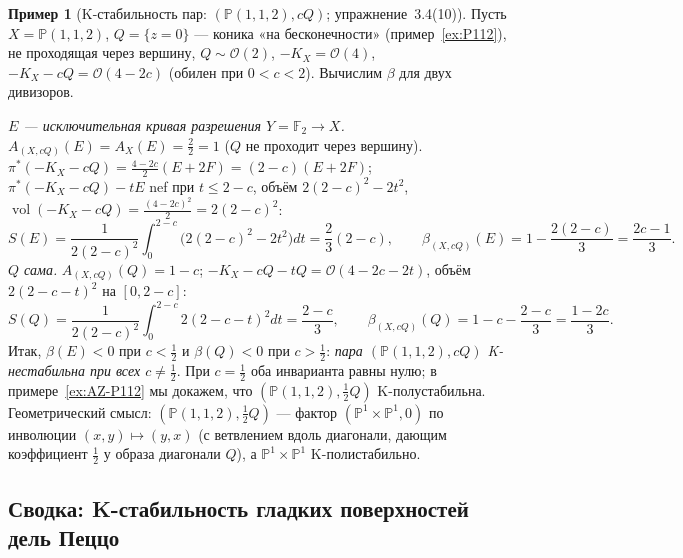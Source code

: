 \documentclass[11pt,a4paper]{article}
\theoremstyle{plain}
\theoremstyle{definition}
\newtheorem{example}[theorem]{Пример}
\theoremstyle{remark}
\newcommand{\PP}{\mathbb{P}}
\newcommand{\cO}{\mathcal{O}}
\DeclareMathOperator{\vol}{vol}
\begin{document}
\begin{example}[K-стабильность пар: $(\PP(1,1,2),cQ)$; упражнение~3.4(10)]\label{ex:P112-pair}
Пусть $X=\PP(1,1,2)$, $Q=\{z=0\}$ --- коника «на бесконечности» (пример~\ref{ex:P112}), не
проходящая через вершину, $Q\sim\cO(2)$, $-K_X=\cO(4)$, $-K_X-cQ=\cO(4-2c)$ (обилен при $0<c<2$).
Вычислим $\beta$ для двух дивизоров.

\emph{$E$ --- исключительная кривая разрешения $Y=\mathbb F_2\to X$.} $A_{(X,cQ)}(E)=A_X(E)=\frac22=1$
($Q$ не проходит через вершину). $\pi^*(-K_X-cQ)=\frac{4-2c}2(E+2F)=(2-c)(E+2F)$;
$\pi^*(-K_X-cQ)-tE$ nef при $t\le2-c$, объём $2(2-c)^2-2t^2$, $\vol(-K_X-cQ)=\frac{(4-2c)^2}2=2(2-c)^2$:
\[
S(E)=\frac1{2(2-c)^2}\int_0^{2-c}\big(2(2-c)^2-2t^2\big)dt=\frac23(2-c),\qquad
\beta_{(X,cQ)}(E)=1-\frac{2(2-c)}3=\frac{2c-1}3 .
\]
\emph{$Q$ сама.} $A_{(X,cQ)}(Q)=1-c$; $-K_X-cQ-tQ=\cO(4-2c-2t)$, объём $2(2-c-t)^2$ на $[0,2-c]$:
\[
S(Q)=\frac1{2(2-c)^2}\int_0^{2-c}2(2-c-t)^2dt=\frac{2-c}3,\qquad
\beta_{(X,cQ)}(Q)=1-c-\frac{2-c}3=\frac{1-2c}3 .
\]
Итак, $\beta(E)<0$ при $c<\frac12$ и $\beta(Q)<0$ при $c>\frac12$: \emph{пара $(\PP(1,1,2),cQ)$
K-нестабильна при всех $c\ne\frac12$}. При $c=\frac12$ оба инварианта равны нулю; в
примере~\ref{ex:AZ-P112} мы докажем, что $(\PP(1,1,2),\frac12Q)$ K-полустабильна. Геометрический
смысл: $(\PP(1,1,2),\frac12Q)$ --- фактор $(\PP^1\times\PP^1,0)$ по инволюции $(x,y)\mapsto(y,x)$
(с ветвлением вдоль диагонали, дающим коэффициент $\frac12$ у образа диагонали $Q$), а
$\PP^1\times\PP^1$ K-полистабильно.
\end{example}

\subsection{Сводка: K-стабильность гладких поверхностей дель Пеццо}
\end{document}
